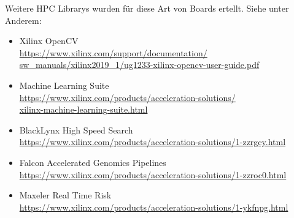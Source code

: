 		Weitere HPC Librarys wurden für diese Art von Boards ertellt. Siehe unter Anderem:
		\begin{itemize}
			\item Xilinx OpenCV \\
			\href{https://www.xilinx.com/support/documentation/sw_manuals/xilinx2019_1/ug1233-xilinx-opencv-user-guide.pdf}{https://www.xilinx.com/support/documentation/ \\ sw{\_}manuals/xilinx2019{\_}1/ug1233-xilinx-opencv-user-guide.pdf}
			
			\item Machine Learning Suite \\
			\href{https://www.xilinx.com/products/acceleration-solutions/xilinx-machine-learning-suite.html}{https://www.xilinx.com/products/acceleration-solutions/ \\ xilinx-machine-learning-suite.html}
			
			\item BlackLynx High Speed Search \\
			\href{https://www.xilinx.com/products/acceleration-solutions/1-zzrgcy.html}{https://www.xilinx.com/products/acceleration-solutions/1-zzrgcy.html}
			
			\item Falcon Accelerated Genomics Pipelines \\
			\href{https://www.xilinx.com/products/acceleration-solutions/1-zzroc0.html}{https://www.xilinx.com/products/acceleration-solutions/1-zzroc0.html}
			
			\item Maxeler Real Time Risk \\
			\href{https://www.xilinx.com/products/acceleration-solutions/1-ykfnpg.html}{https://www.xilinx.com/products/acceleration-solutions/1-ykfnpg.html}
		\end{itemize}